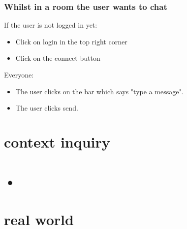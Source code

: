\subsubsection{Whilst in a room the user wants to chat}
If the user is not logged in yet:
\begin{itemize}
\item Click on login in the top right corner
\item Click on the connect button %
\end{itemize}
Everyone:
\begin{itemize}
\item The user clicks on the bar which says "type a message".
\item The user clicks send.
\end{itemize}



\section{context inquiry}

\section{•}



\section{real world}